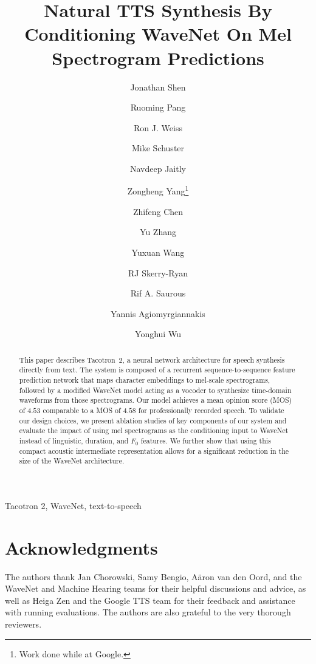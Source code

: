 \documentclass{article}
\title{\large \bf Natural TTS Synthesis By Conditioning WaveNet On Mel Spectrogram Predictions}
\author[1]{Jonathan Shen}
\author[1]{Ruoming Pang}
\author[1]{Ron J. Weiss}
\author[1]{Mike Schuster}
\author[1]{Navdeep Jaitly}
\author[2]{Zongheng Yang\thanks{Work done while at Google.}}
\author[1]{Zhifeng Chen}
\author[1]{Yu Zhang}
\author[1]{Yuxuan Wang}
\author[1]{RJ Skerry-Ryan}
\author[1]{Rif A. Saurous}
\author[1]{Yannis Agiomyrgiannakis}
\author[1]{Yonghui Wu}
\affil[1]{Google, Inc.}
\affil[2]{University of California, Berkeley}
\affil[ ]{\texttt{\{jonathanasdf,rpang,yonghui\}@google.com}}
\date{}
\begin{document}
\ninept
%
\maketitle
%

\begin{abstract}
This paper describes Tacotron~2,
a neural network architecture for speech synthesis directly
from text. The system is composed of a recurrent sequence-to-sequence feature
prediction network that maps character embeddings to
mel-scale spectrograms, followed by a modified WaveNet model acting as a vocoder
to synthesize time-domain waveforms from those spectrograms. Our model achieves
a mean opinion score (MOS) of $4.53$ comparable to a MOS of $4.58$ for
professionally recorded speech.
To validate our design choices, we present ablation studies of key components of
our system and evaluate the impact of using mel spectrograms as the conditioning
input to WaveNet instead of linguistic, duration, and $F_0$ features. We further
show that using this compact acoustic intermediate representation allows
for a significant reduction in the size of the WaveNet architecture.
\end{abstract}
%
\begin{keywords}
Tacotron 2, WaveNet, text-to-speech
\end{keywords}
%












\section{Acknowledgments}
The authors thank Jan Chorowski, Samy Bengio, A{\"a}ron van den Oord, and the
  WaveNet and Machine Hearing teams for their helpful discussions and advice, as
  well as Heiga Zen and the Google TTS team for their feedback and assistance
  with running evaluations.
  The authors are also grateful to the very thorough reviewers.


\end{document}
